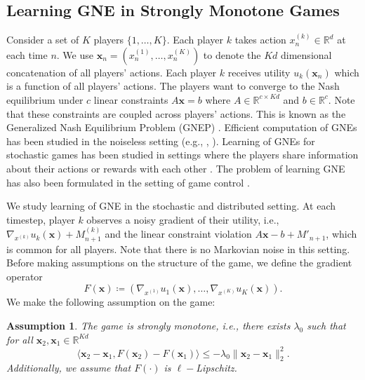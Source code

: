\documentclass[letterpaper, 10 pt, conference]{ieeeconf}  %
\theoremstyle{definition}
\theoremstyle{plain}
\newtheorem{assumption}{Assumption}
\newcommand{\RR}{\mathbb{R}}
\newcommand{\xx}{\mathbf{x}}
\begin{document}
\subsection{Learning GNE in Strongly Monotone Games}
Consider a set of $K$ players $\{1, \ldots, K\}$. Each player $k$ takes action $x^{(k)}_n\in\RR^{d}$ at each time $n$. We use $\xx_n=(x^{(1)}_n,\ldots,x^{(K)}_n)$ to denote the $Kd$ dimensional concatenation of all players' actions. Each player $k$ receives utility $u_k(\xx_n)$ which is a function of all players' actions. The players want to converge to the Nash equilibrium under $c$ linear constraints $A\xx=b$ where $A\in\RR^{c\times Kd}$ and $b\in\RR^c$. Note that these constraints are coupled across players' actions. This is known as the Generalized Nash Equilibrium Problem (GNEP) \cite{GNEP}. Efficient computation of GNEs has been studied in the noiseless setting (e.g., \cite{GNE-noiseless-1}, \cite{GNE-noiseless-2}). Learning of GNEs for stochastic games has been studied in settings where the players share information about their actions or rewards with each other \cite{GNE-central-1, GNE-central-2}. The problem of learning GNE has also been formulated in the setting of game control \cite{Chandak-game}.

We study learning of GNE in the stochastic and distributed setting. At each timestep, player $k$ observes a noisy gradient of their utility, i.e., $\nabla_{x^{(k)}}u_k(\xx)+M^{(k)}_{n+1}$ and the linear constraint violation $A\xx-b+M'_{n+1}$, which is common for all players. Note that there is no Markovian noise in this setting. Before making assumptions on the structure of the game, we define the gradient operator $$F(\xx)\coloneqq (\nabla_{x^{(1)}}u_1(\xx),\ldots,\nabla_{x^{(K)}}u_K(\xx)).$$ We make the following assumption on the game:
\begin{assumption}\label{assu-game}
    The game is strongly monotone, i.e., there exists $\lambda_0$ such that for all $\xx_2,\xx_1\in\RR^{Kd}$ $$\langle \xx_2-\xx_1,F(\xx_2)-F(\xx_1)\rangle\leq -\lambda_0\|\xx_2-\xx_1\|_2^2.$$
    Additionally, we assume that $F(\cdot)$ is $\ell-$Lipschitz. 
\end{assumption}
\end{document}
